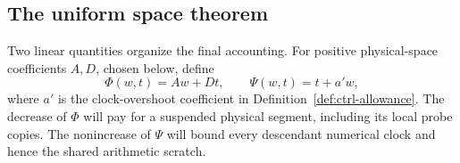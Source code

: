 \subsection{The uniform space theorem}\label{sec:ctrl-space}

Two linear quantities organize the final accounting.  For positive
physical-space coefficients $A,D$, chosen below, define
\begin{equation}\label{eq:ctrl-potentials}
 \Phi(w,t)=Aw+Dt,\qquad \Psi(w,t)=t+a'w,
\end{equation}
where $a'$ is the clock-overshoot coefficient in
Definition~\ref{def:ctrl-allowance}.  The decrease of $\Phi$ will pay for
a suspended physical segment, including its local probe copies.
The nonincrease of $\Psi$ will bound every descendant numerical clock
and hence the shared arithmetic scratch.



